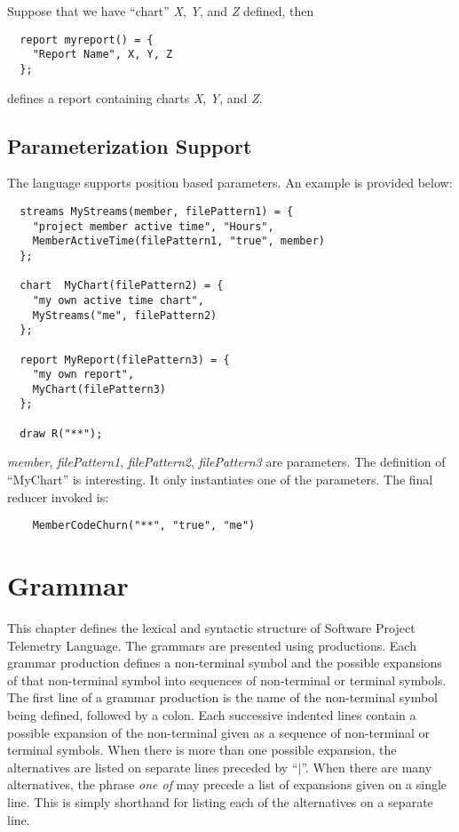 Suppose that we have ``chart'' \textit{X}, \textit{Y}, and \textit{Z} defined, then
\begin{verbatim}
  report myreport() = {
    "Report Name", X, Y, Z
  };
\end{verbatim}      
defines a report containing charts \textit{X}, \textit{Y}, and \textit{Z}.

         

 
\subsection{Parameterization Support}

The language supports position based parameters. An example is provided below:
\begin{verbatim}
  streams MyStreams(member, filePattern1) = {
    "project member active time", "Hours",
    MemberActiveTime(filePattern1, "true", member)
  };
  
  chart  MyChart(filePattern2) = {
    "my own active time chart",
    MyStreams("me", filePattern2)
  };
  
  report MyReport(filePattern3) = {
    "my own report",
    MyChart(filePattern3)
  };
  
  draw R("**");
\end{verbatim}
\textit{member}, \textit{filePattern1}, \textit{filePattern2}, \textit{filePattern3} are parameters. The definition of ``MyChart'' is interesting. It only instantiates one of the parameters. The final reducer invoked is:
\begin{verbatim}
    MemberCodeChurn("**", "true", "me")
\end{verbatim}
 
 
 
 
 
 
 
\section{Grammar}  \label{TelemetryLanguageSpecification:Grammar}

This chapter defines the lexical and syntactic structure of Software Project Telemetry Language. The grammars are presented using productions. Each grammar production defines a non-terminal symbol and the possible expansions of that non-terminal symbol into sequences of non-terminal or terminal symbols. The first line of a grammar production is the name of the non-terminal symbol being defined, followed by a colon. Each successive indented lines contain a possible expansion of the non-terminal given as a sequence of non-terminal or terminal symbols. When there is more than one possible expansion, the alternatives are listed on separate lines preceded by ``$|$''. When there are many alternatives, the phrase \textit{one of} may precede a list of expansions given on a single line. This is simply shorthand for listing each of the alternatives on a separate line.


